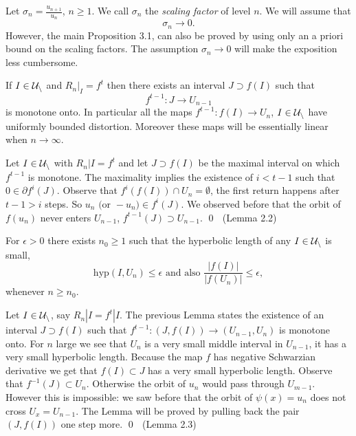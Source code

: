 \bigskip

\flushpar
Let $\sigma_n=\frac{u_{n+1}}{u_n}$, $n\ge 1$. We call $\sigma_n$ the 
{\it scaling factor} of level $n$. We will assume that
$$
\sigma_n\to 0.
$$
However, the main Proposition 3.1, can also be proved by using only an 
a priori bound on the scaling factors. The assumption $\sigma_n\to 0$ will
make the exposition less cumbersome.

If $I\in \Cal{U}_n$ and $R_n|_I=f^t$ then there exists an interval 
$J\supset f(I)$ such that 
$$
f^{t-1}:J\to U_{n-1}
$$ 
is monotone onto. In particular all the maps $f^{t-1}: f(I) \to U_n$, 
$I\in \Cal{U}_n$ have uniformly bounded distortion. Moreover these maps will
be essentially linear when $n\to \infty$. 
\endproclaim

Let $I\in \Cal{U}_n$ with $R_n|I=f^t$ and let 
$J\supset f(I)$ be the maximal interval
on which $f^{t-1}$ is monotone. The maximality implies the existence of $i<t-1$
such that $0\in \partial f^i(J)$. Observe that $f^i(f(I))\cap U_n=\emptyset$,
the first return happens after $t-1>i$ steps. 
So $u_n \text{ (or } -u_n\text{)}\in
f^i(J)$. We observed before that the orbit of $f(u_n)$ never enters $U_{n-1}$,
$f^{t-1}(J)\supset U_{n-1}$.
\hfill\hfill\qed $\,\,$ (Lemma 2.2)
\enddemo

 For $\epsilon>0$ there exists $n_0\ge 1$ such that 
the hyperbolic length of any $I\in\Cal{U}_n$ is small,
$$
\text{hyp}(I,U_n)\le \epsilon \text{ and also } 
\frac{|f(I)|}{|f(U_n)|}\le \epsilon,
$$
whenever $n\ge n_0$.
\endproclaim

 Let $I\in \Cal{U}_n$, say $R_n|I=f^t|I$. 
The previous Lemma states the existence of an interval $J\supset f(I)$ 
such that $f^{t-1}:(J,f(I))\to (U_{n-1},U_n)$ is monotone onto. For $n$ large
we see that $U_n$ is a very small middle interval in $U_{n-1}$, it has a very
small hyperbolic length. Because the map $f$ has negative Schwarzian
derivative we get that $f(I)\subset J$ has a very small hyperbolic length.
Observe that $f^{-1}(J)\subset U_n$. Otherwise the orbit of $u_n$ would pass 
through $U_{m-1}$. However this is impossible: we saw before that the orbit 
of $\psi(x)=u_n$ does not cross $U_x=U_{n-1}$.
The Lemma will be proved by pulling back the pair $(J,f(I))$ one step more.
\hfill\hfill\qed $\,\,$ (Lemma 2.3)
\enddemo







